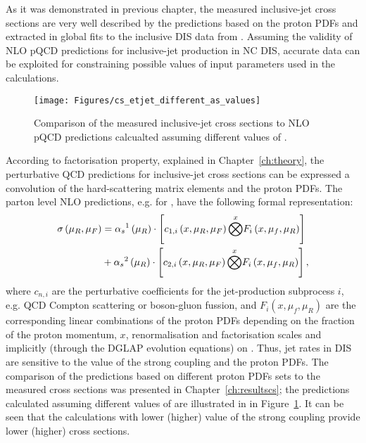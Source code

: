 As it was demonstrated in previous chapter, the measured inclusive-jet cross sections are very well described by the predictions based on the proton PDFs and \asz extracted in global fits to the inclusive DIS data from \hera. Assuming the validity of NLO pQCD predictions for inclusive-jet production in NC DIS, accurate data can be exploited for constraining possible values of input parameters used in the calculations.
\begin{figure}[t]
 \centering
 \texttt{[image: Figures/cs\_etjet\_different\_as\_values]}
 \caption{Comparison of the measured inclusive-jet cross sections to NLO pQCD predictions calcualted assuming different values of \asz.}
 \label{fig:etjetdifferentas}
\end{figure}

According to factorisation property, explained in Chapter~\ref{ch:theory}, the perturbative QCD predictions for inclusive-jet cross sections can be expressed a convolution of the hard-scattering matrix elements and the proton PDFs. The parton level NLO predictions, e.g. for \dsdetjetb, have the following formal representation:
\begin{equation}
	\begin{split}
\sigma\left( \mu_R, \mu_F\right)  &= \mbox{$\alpha_{s}$}^1\left( \mu_R\right) \cdot \left[ c_{1,i}\left( x, \mu_R, \mu_F\right) \overset{x}{\bigotimes } F_i\left( x, \mu_f, \mu_R \right) \right] \\
&+ \mbox{$\alpha_{s}$}^2\left( \mu_R\right) \cdot \left[ c_{2,i}\left( x, \mu_R, \mu_F\right) \overset{x}{\bigotimes } F_i\left( x, \mu_f, \mu_R \right) \right],
	\end{split}
\end{equation}
where $c_{n,i}$ are the perturbative coefficients for the jet-production subprocess $i$, e.g. QCD Compton scattering or boson-gluon fussion, and $F_i\left( x, \mu_f, \mu_R \right)$ are the corresponding linear combinations of the proton PDFs depending on the fraction of the proton momentum, $x$, renormalisation and factorisation scales and implicitly (through the DGLAP evolution equations) on \as. Thus, jet rates in DIS are sensitive to the value of the strong coupling and the proton PDFs. The comparison of the predictions based on different proton PDFs sets to the measured cross sections was presented in Chapter~\ref{ch:resultscs}; the predictions calculated assuming different values of \asz are illustrated in in Figure~\ref{fig:etjetdifferentas}. It can be seen that the calculations with lower (higher) value of the strong coupling provide lower (higher) cross sections.

